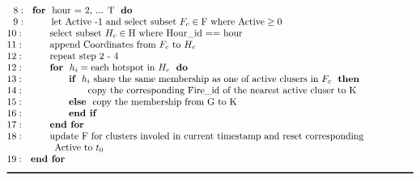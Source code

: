 \documentclass[11pt,a4paper,]{article}
\begin{document}
\begin{table}
\begin{align*}
&~~8:~~\textbf{for}~~\text{hour = 2, ... T}~~\textbf{do} \\[-1\jot]
&~~9:~~~~~~~~\text{let Active -1 and select subset }F_c \in \text{F where Active} \geq 0\\[-1\jot]
&10:~~~~~~~~\text{select subset }H_c \in \text{H where Hour\textunderscore id == hour}\\[-1\jot]
&11:~~~~~~~~\text{append Coordinates from }F_c~\text{to}~H_c\\[-1\jot]
&12:~~~~~~~~\text{repeat step 2 - 4}\\[-1\jot]
&12:~~~~~~~~\textbf{for}~~h_i = \text{each hotspot in }H_c~~\textbf{do}\\[-1\jot]
&13:~~~~~~~~~~~~~~\textbf{if}~~h_i~\text{share the same membership as one of active clusers in }F_c~~\textbf{then}\\[-1\jot]
&14:~~~~~~~~~~~~~~~~~~~~\text{copy the corresponding Fire\textunderscore id of the nearest active cluser to K}\\[-1\jot]
&15:~~~~~~~~~~~~~~\textbf{else}~~\text{copy the membership from G to K}\\[-1\jot]
&16:~~~~~~~~~~~~~~\textbf{end if}\\[-1\jot]
&17:~~~~~~~~\textbf{end for}\\[-1\jot]
&18:~~~~~~~~\text{update F for clusters involed in current timestamp and reset corresponding}\\[-1\jot]
&~~~~~~~~~~~~~~~\text{Active to }t_0\\[-1\jot]
&19:~~\textbf{end for}\\[-1\jot]
&\rule{150mm}{0.5mm}
\end{align*}
\end{table}
\end{document}
